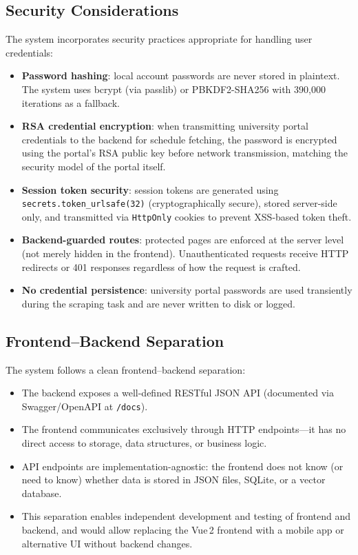 \documentclass[12pt,a4paper]{article}
\begin{document}
\subsection{Security Considerations}

The system incorporates security practices appropriate for handling user credentials:

\begin{itemize}[nosep]
    \item \textbf{Password hashing}: local account passwords are never stored in plaintext. The system uses bcrypt (via passlib) or PBKDF2-SHA256 with 390,000 iterations as a fallback.
    \item \textbf{RSA credential encryption}: when transmitting university portal credentials to the backend for schedule fetching, the password is encrypted using the portal's RSA public key before network transmission, matching the security model of the portal itself.
    \item \textbf{Session token security}: session tokens are generated using \texttt{secrets.token\_urlsafe(32)} (cryptographically secure), stored server-side only, and transmitted via \texttt{HttpOnly} cookies to prevent XSS-based token theft.
    \item \textbf{Backend-guarded routes}: protected pages are enforced at the server level (not merely hidden in the frontend). Unauthenticated requests receive HTTP redirects or 401 responses regardless of how the request is crafted.
    \item \textbf{No credential persistence}: university portal passwords are used transiently during the scraping task and are never written to disk or logged.
\end{itemize}

\subsection{Frontend--Backend Separation}

The system follows a clean frontend--backend separation:

\begin{itemize}[nosep]
    \item The backend exposes a well-defined RESTful JSON API (documented via Swagger/OpenAPI at \texttt{/docs}).
    \item The frontend communicates exclusively through HTTP endpoints---it has no direct access to storage, data structures, or business logic.
    \item API endpoints are implementation-agnostic: the frontend does not know (or need to know) whether data is stored in JSON files, SQLite, or a vector database.
    \item This separation enables independent development and testing of frontend and backend, and would allow replacing the Vue\,2 frontend with a mobile app or alternative UI without backend changes.
\end{itemize}
\end{document}
